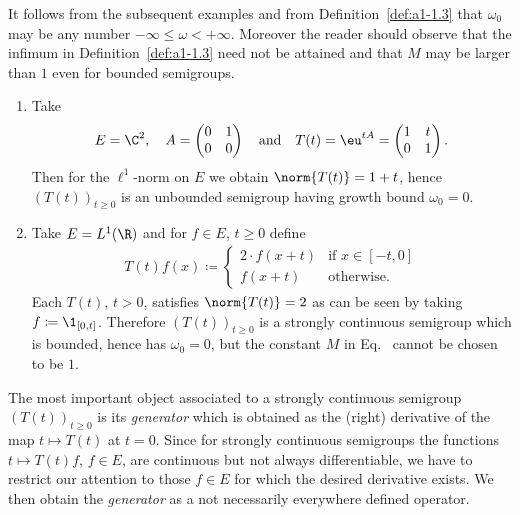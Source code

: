 It follows from the subsequent examples and from Definition~\ref{def:a1-1.3} that $\omega_{0}$ may be any number $ -\infty \leq \omega < +\infty$.
Moreover the reader should observe that the infimum in Definition~\ref{def:a1-1.3} need not be attained and that $M$ may be larger than $1$ even for bounded semigroups.
\begin{examples}\label{ex:a1-1.4}
\begin{enumerate}[\upshape(i), wide, labelindent=.25em]

\item 
Take 
\[
	E = \C^{2}, \quad
	A = \begin{pmatrix}0 & 1\\0 & 0\end{pmatrix} 
	\quad \text{and} \quad 
	T(t) =  \eu^{tA} = \begin{pmatrix}1 & t\\0 & 1\end{pmatrix} .
\]
%
Then for the $\ell^{1}$-norm on $E$ we obtain $\norm{T(t)} = 1 + t$, hence $(T(t))_{t\geq0}$ is an unbounded semigroup having growth bound $\omega_{0} = 0$.

\item 
Take $E = L^1(\R)$ and for $f \in E$, $t \geq 0$ define
\begin{align*}
T(t)f(x) \coloneqq 
	\begin{cases}
		2\cdot f(x+t) & \text{if } x \in [-t,0] \\
		f(x+t) & \text{otherwise}.
	\end{cases}
\end{align*}
Each $T(t)$, $t > 0$, satisfies $\norm{T(t)} = 2$ as can be seen by taking $f \coloneq  \1_{[0,t]}$.
Therefore $(T(t))_{t \geq 0}$ is a strongly continuous semigroup which is bounded, hence has $\omega_{0} = 0$, but the constant $M$ in Eq.~ cannot be chosen to be $1$.

\end{enumerate}
\end{examples} 
The most important object associated to a strongly continuous semigroup $(T(t))_{t\geq0}$ is its \emph{generator} which is obtained as the (right) derivative of the map $t \mapsto T(t)$ at $t = 0$.
Since for strongly continuous semigroups the functions $t \mapsto T(t)f$, $f \in E$, are continuous but not always differentiable, we have to restrict our attention to those $f \in E$ for which the desired derivative exists.
We then obtain the \emph{generator} as a not necessarily everywhere defined operator.
